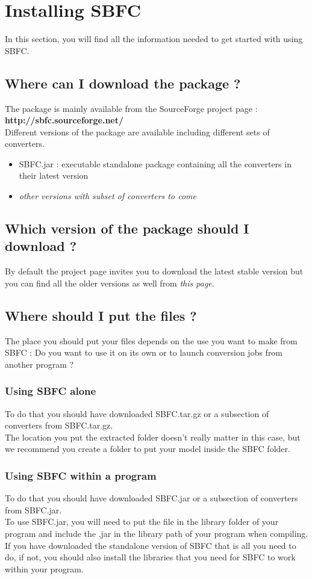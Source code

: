 \documentclass{article}
\begin{document}
\section{Installing SBFC}
In this section, you will find all the information needed to get started with using SBFC. 
	\subsection{Where can I download the package ?}
The package is mainly available from the SourceForge project page : {\bf http://sbfc.sourceforge.net/} \\
Different versions of the package are available including different sets of converters.\\
\begin{itemize}
\item SBFC.jar : executable standalone package containing all the converters in their latest version 
\item {\it other versions with subset of converters to come}
\end{itemize}
	\subsection{Which version of the package should I download ?}
By default the project page invites you to download the latest stable version but you can find all the older versions as well from {\it this page}.
	\subsection{Where should I put the files ?}
The place you should put your files depends on the use you want to make from SBFC : Do you want to use it on its own or
to launch conversion jobs from another program ?
		\subsubsection{Using SBFC alone}
To do that you should have downloaded SBFC.tar.gz or a subsection of converters from SBFC.tar.gz.\\
The location you put the extracted folder doesn't really matter in this case, but we recommend you create a folder to put your model inside the SBFC folder.
		\subsubsection{Using SBFC within a program}
To do that you should have downloaded SBFC.jar or a subsection of converters from SBFC.jar.\\
To use SBFC.jar, you will need to put the file in the library folder of your program and include the .jar in the library path of your program when compiling. If you have downloaded the standalone version of SBFC that is all you need to do, if not, you should also install the libraries that you need for SBFC to work within your program.
\end{document}
